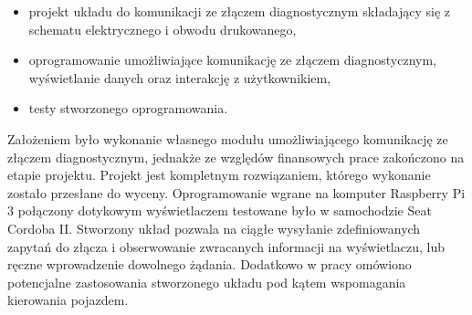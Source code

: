 \documentclass[12pt]{article} %
\numberwithin{equation}{subsection}
\numberwithin{figure}{section}
\numberwithin{table}{section}
\begin{document}
	\begin{itemize}
		\item{projekt układu do komunikacji ze złączem diagnostycznym składający się z schematu elektrycznego i obwodu drukowanego,}
		\item{oprogramowanie umożliwiające komunikację ze złączem diagnostycznym, wyświetlanie danych oraz interakcję z użytkownikiem,}
		\item{testy stworzonego oprogramowania.}
	\end{itemize}
	
	Założeniem było wykonanie własnego modułu umożliwiającego komunikację ze złączem diagnostycznym, jednakże ze względów finansowych prace zakończono na etapie projektu. Projekt jest kompletnym rozwiązaniem, którego wykonanie zostało przesłane do wyceny. Oprogramowanie wgrane na komputer Raspberry Pi 3 połączony dotykowym wyświetlaczem testowane było w samochodzie Seat Cordoba II. Stworzony układ pozwala na ciągłe wysyłanie zdefiniowanych zapytań do złącza i obserwowanie zwracanych informacji na wyświetlaczu, lub ręczne wprowadzenie dowolnego żądania. Dodatkowo w pracy omówiono potencjalne zastosowania stworzonego układu pod kątem wspomagania kierowania pojazdem. 
	
	\newpage	
	
\end{document}
